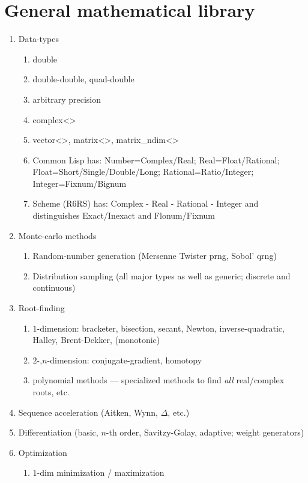 \documentclass[10pt,dvipdfmx,letterpaper,twoside]{article}
\begin{document}
\section{General mathematical library}
\begin{enumerate}
\item Data-types
  \begin{enumerate}
  \item double
  \item double-double, quad-double
  \item arbitrary precision
  \item complex<>
  \item vector<>, matrix<>, matrix\_ndim<>
  \item Common Lisp has: Number=Complex/Real; Real=Float/Rational; Float=Short/Single/Double/Long; Rational=Ratio/Integer;
    Integer=Fixnum/Bignum
  \item Scheme (R6RS) has: Complex - Real - Rational - Integer and distinguishes Exact/Inexact and Flonum/Fixnum
  \end{enumerate}
\item Monte-carlo methods
  \begin{enumerate}
  \item Random-number generation (Mersenne Twister prng, Sobol' qrng)
  \item Distribution sampling (all major types as well as generic; discrete and continuous)
  \end{enumerate}
\item Root-finding
  \begin{enumerate}
  \item $1$-dimension: bracketer, bisection, secant, Newton, inverse-quadratic, Halley, Brent-Dekker, (monotonic)
  \item $2$-,$n$-dimension: conjugate-gradient, homotopy
  \item polynomial methods --- specialized methods to find {\em all} real/complex roots, etc.
  \end{enumerate}
\item Sequence acceleration (Aitken, Wynn, $\Delta$, etc.)
\item Differentiation (basic, $n$-th order, Savitzy-Golay, adaptive; weight generators)
\item Optimization
  \begin{enumerate}
  \item $1$-dim minimization / maximization

\end{enumerate}
\end{enumerate}
\end{document}
